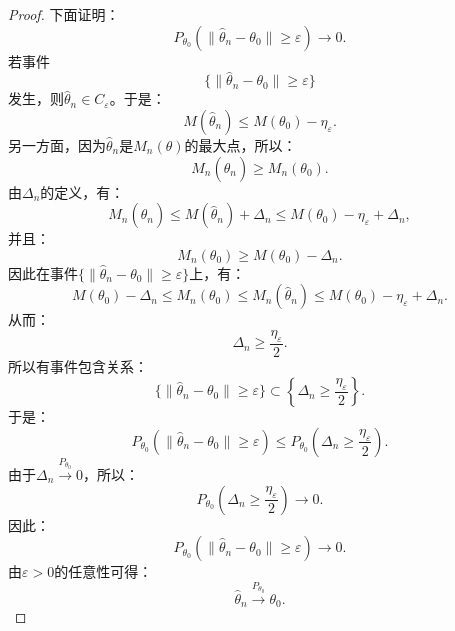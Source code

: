 \begin{proof}
	下面证明：
	\begin{equation*}
		P_{\theta_0}(\|\hat{\theta}_n-\theta_0\|\geqslant\varepsilon)
		\longrightarrow 0.
	\end{equation*}
	若事件
	\begin{equation*}
		\{\|\hat{\theta}_n-\theta_0\|\geqslant\varepsilon\}
	\end{equation*}
	发生，则$\hat{\theta}_n\in C_\varepsilon$。于是：
	\begin{equation*}
		M(\hat{\theta}_n)
		\leqslant
		M(\theta_0)-\eta_\varepsilon.
	\end{equation*}
	另一方面，因为$\hat{\theta}_n$是$M_n(\theta)$的最大点，所以：
	\begin{equation*}
		M_n(\hat{\theta}_n)
		\geqslant
		M_n(\theta_0).
	\end{equation*}
	由$\Delta_n$的定义，有：
	\begin{equation*}
		M_n(\hat{\theta}_n)
		\leqslant
		M(\hat{\theta}_n)+\Delta_n
		\leqslant
		M(\theta_0)-\eta_\varepsilon+\Delta_n,
	\end{equation*}
	并且：
	\begin{equation*}
		M_n(\theta_0)
		\geqslant
		M(\theta_0)-\Delta_n.
	\end{equation*}
	因此在事件$\{\|\hat{\theta}_n-\theta_0\|\geqslant\varepsilon\}$上，有：
	\begin{equation*}
		M(\theta_0)-\Delta_n
		\leqslant
		M_n(\theta_0)
		\leqslant
		M_n(\hat{\theta}_n)
		\leqslant
		M(\theta_0)-\eta_\varepsilon+\Delta_n.
	\end{equation*}
	从而：
	\begin{equation*}
		\Delta_n\geqslant\frac{\eta_\varepsilon}{2}.
	\end{equation*}
	所以有事件包含关系：
	\begin{equation*}
		\{\|\hat{\theta}_n-\theta_0\|\geqslant\varepsilon\}
		\subset
		\left\{
		\Delta_n\geqslant\frac{\eta_\varepsilon}{2}
		\right\}.
	\end{equation*}
	于是：
	\begin{equation*}
		P_{\theta_0}(\|\hat{\theta}_n-\theta_0\|\geqslant\varepsilon)
		\leqslant
		P_{\theta_0}\left(
		\Delta_n\geqslant\frac{\eta_\varepsilon}{2}
		\right).
	\end{equation*}
	由于$\Delta_n\xrightarrow{P_{\theta_0}}0$，所以：
	\begin{equation*}
		P_{\theta_0}\left(
		\Delta_n\geqslant\frac{\eta_\varepsilon}{2}
		\right)
		\longrightarrow 0.
	\end{equation*}
	因此：
	\begin{equation*}
		P_{\theta_0}(\|\hat{\theta}_n-\theta_0\|\geqslant\varepsilon)
		\longrightarrow 0.
	\end{equation*}
	由$\varepsilon>0$的任意性可得：
	\begin{equation*}
		\hat{\theta}_n\xrightarrow{P_{\theta_0}}\theta_0.
	\end{equation*}
\end{proof}